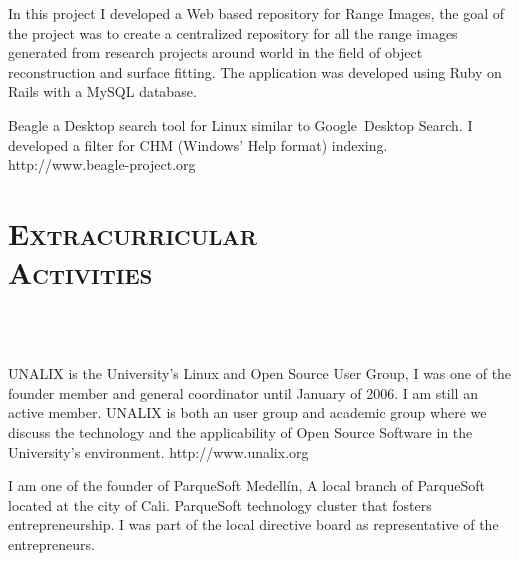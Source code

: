 \begin{resume}
\begin{position}
 In this project I developed a Web based repository for Range Images, the goal of the
 project was to create a centralized repository for all the range
 images generated from research projects around world in the field of
 object reconstruction and surface fitting. The application was
 developed using Ruby on Rails with a MySQL database.

\end{position}

\begin{position}
Beagle a Desktop search tool  for Linux similar to
Google\texttrademark  \  Desktop
Search. I developed a filter for CHM (Windows' Help format) indexing.
http://www.beagle-project.org
\end{position}


\section{\textsc{Extracurricular\\ Activities}}

\begin{formatb}
  \\
   
  \body\\
\end{formatb}

\begin{position}
UNALIX is the University's Linux and Open Source User Group, I was one
of the founder member  and general coordinator until January of
2006. I am still an active member. UNALIX is both an user group and academic group where we
discuss the technology and the applicability of Open Source Software
in the University's environment. http://www.unalix.org
\end{position}

\begin{position}
I am one of the founder of ParqueSoft Medell\'{i}n, A local branch of
ParqueSoft located at the city of Cali. ParqueSoft technology cluster
that fosters entrepreneurship. I was part of the local directive board
as representative of the entrepreneurs.
\end{position}


\end{resume}
